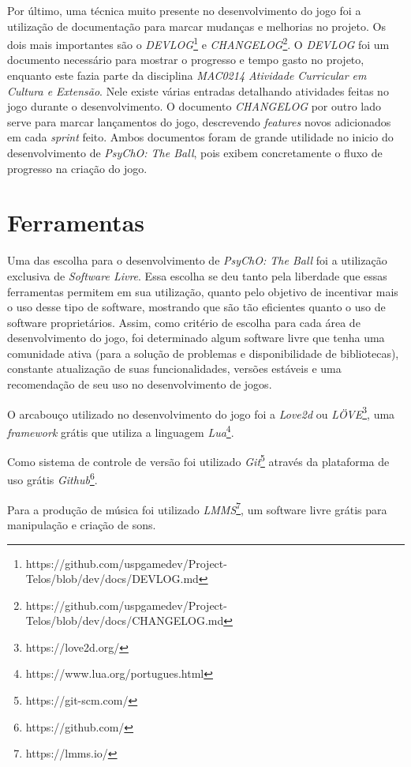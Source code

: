 Por último, uma técnica muito presente no desenvolvimento do jogo foi a utilização de documentação para marcar mudanças e melhorias no projeto. Os dois mais importantes são o \textit{DEVLOG}\footnote{https://github.com/uspgamedev/Project-Telos/blob/dev/docs/DEVLOG.md} e \textit{CHANGELOG}\footnote{https://github.com/uspgamedev/Project-Telos/blob/dev/docs/CHANGELOG.md}. O \textit{DEVLOG} foi um documento necessário para mostrar o progresso e tempo gasto no projeto, enquanto este fazia parte da disciplina \textit{MAC0214 Atividade Curricular em Cultura e Extensão}. Nele existe várias entradas detalhando atividades feitas no jogo durante o desenvolvimento. O documento \textit{CHANGELOG} por outro lado serve para marcar lançamentos do jogo, descrevendo \textit{features} novos adicionados em cada \textit{sprint} feito. Ambos documentos foram de grande utilidade no inicio do desenvolvimento de \textit{PsyChO: The Ball}, pois exibem concretamente o fluxo de progresso na criação do jogo.

\section{Ferramentas}
\label{sec:ferramentas}

Uma das escolha para o desenvolvimento de \textit{PsyChO: The Ball} foi a utilização exclusiva de \textit{Software Livre}. Essa escolha se deu tanto pela liberdade que essas ferramentas permitem em sua utilização, quanto pelo objetivo de incentivar mais o uso desse tipo de software, mostrando que são tão eficientes quanto o uso de software proprietários. Assim, como critério de escolha para cada área de desenvolvimento do jogo, foi determinado algum software livre que tenha uma comunidade ativa (para a solução de problemas e disponibilidade de bibliotecas), constante atualização de suas funcionalidades, versões estáveis e uma recomendação de seu uso no desenvolvimento de jogos.

O arcabouço utilizado no desenvolvimento do jogo foi a \textit{Love2d} ou \textit{LÖVE}\footnote{https://love2d.org/}, uma \textit{framework} grátis que utiliza a linguagem \textit{Lua}\footnote{https://www.lua.org/portugues.html}.

Como sistema de controle de versão foi utilizado \textit{Git}\footnote{https://git-scm.com/} através da plataforma de uso grátis \textit{Github}\footnote{https://github.com/}.

Para a produção de música foi utilizado \textit{LMMS}\footnote{https://lmms.io/}, um software livre grátis para manipulação e criação de sons.

